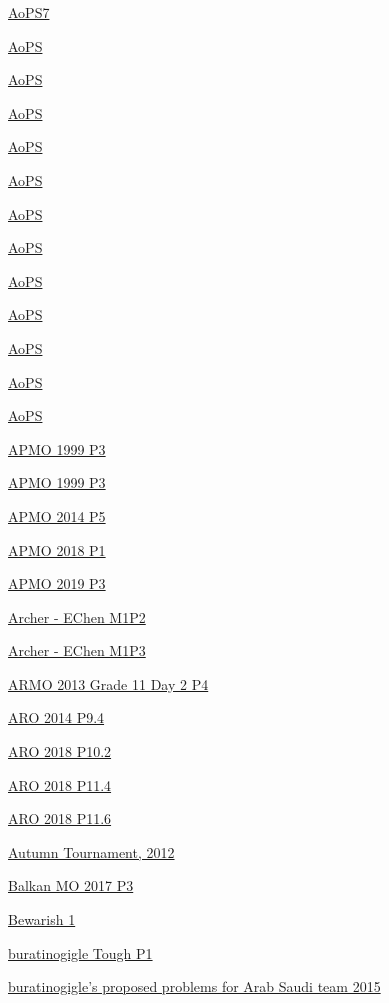 \hyperref  [problem:AoPS7]{AoPS7}

\hyperref  [problem:AoPS]{AoPS}

\hyperref  [problem:AoPS]{AoPS}

\hyperref  [problem:AoPS]{AoPS}

\hyperref  [problem:AoPS]{AoPS}

\hyperref  [problem:AoPS]{AoPS}

\hyperref  [problem:AoPS]{AoPS}

\hyperref  [problem:AoPS]{AoPS}

\hyperref  [problem:AoPS]{AoPS}

\hyperref  [problem:AoPS]{AoPS}

\hyperref  [problem:AoPS]{AoPS}

\hyperref  [problem:AoPS]{AoPS}

\hyperref  [problem:AoPS]{AoPS}

\hyperref  [problem:APMO 1999 P3]{APMO 1999 P3}

\hyperref  [problem:APMO 1999 P3]{APMO 1999 P3}

\hyperref  [problem:APMO 2014 P5]{APMO 2014 P5}

\hyperref  [problem:APMO 2018 P1]{APMO 2018 P1}

\hyperref  [problem:APMO 2019 P3]{APMO 2019 P3}

\hyperref  [problem:Archer - EChen M1P2]{Archer - EChen M1P2}

\hyperref  [problem:Archer - EChen M1P3]{Archer - EChen M1P3}

\hyperref  [problem:ARMO 2013 Grade 11 Day 2 P4]{ARMO 2013 Grade 11 Day 2 P4}

\hyperref  [problem:ARO 2014 P9.4]{ARO 2014 P9.4}

\hyperref  [problem:ARO 2018 P10.2]{ARO 2018 P10.2}

\hyperref  [problem:ARO 2018 P11.4]{ARO 2018 P11.4}

\hyperref  [problem:ARO 2018 P11.6]{ARO 2018 P11.6}

\hyperref  [problem:Autumn Tournament, 2012]{Autumn Tournament, 2012}

\hyperref  [problem:Balkan MO 2017 P3]{Balkan MO 2017 P3}

\hyperref  [problem:Bewarish 1]{Bewarish 1}

\hyperref  [problem:buratinogigle Tough P1]{buratinogigle Tough P1}

\hyperref  [problem:buratinogigle's proposed problems for Arab Saudi team 2015]{buratinogigle's proposed problems for Arab Saudi team 2015}

